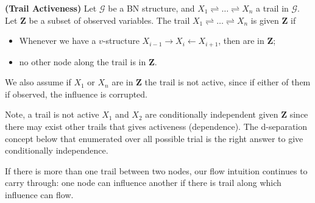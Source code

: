 \documentclass{article}
\newcommand{\bfs}[1]{\textbf{({#1}) }}
\begin{document}
\begin{defa}\bfs{Trail Activeness}
Let $\mathcal{G}$ be a BN structure, and $X_{1} \rightleftharpoons \ldots \rightleftharpoons X_{n}$ a trail in $\mathcal{G}$. Let $\boldsymbol{Z}$ be a subset of observed variables. The trail $X_{1} \rightleftharpoons \ldots \rightleftharpoons X_{n}$ is  given $\boldsymbol{Z}$ if
\begin{itemize}
    \item Whenever we have a $v$-structure $X_{i-1} \rightarrow X_{i} \leftarrow X_{i+1}$, then  are in $\boldsymbol{Z}$;
    \item no other node along the trail is in $\boldsymbol{Z}$.
\end{itemize}
We also assume if $X_{1}$ or $X_{n}$ are in $\boldsymbol{Z}$ the trail is not active, since if either of them if observed, the influence is corrupted.
\end{defa}
\begin{rema}\label{re:faracvc}
Note,  a trail is not active  $X_1$ and $X_2$ are conditionally independent given $\boldsymbol{Z}$ since there may exist other trails that gives activeness (dependence). The d-separation concept below that enumerated over all possible trial is the right answer to give  conditionally independence.
\end{rema}

If there is more than one trail between two nodes, our flow intuition continues to carry through: one node can influence another if there is  trail along which influence can flow.
\end{document}
